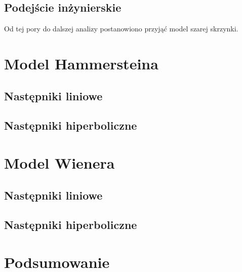 \documentclass[a4paper,titlepage,11pt,floatssmall]{mwrep}
\begin{document}
\newpage

\section{Podejście inżynierskie}
Od tej pory do dalszej analizy postanowiono przyjąć model szarej skrzynki. 

\chapter{Model Hammersteina}
	\section{Następniki liniowe}
	\section{Następniki hiperboliczne}

\chapter{Model Wienera}
	\section{Następniki liniowe}
	\section{Następniki hiperboliczne}
\chapter{Podsumowanie}

\listoffigures
\listoftables
\end{document}
